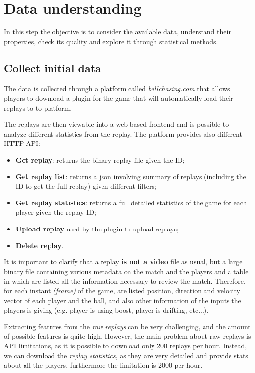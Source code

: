 \section{Data understanding} \label{seq:data_understanding}

 In this step the objective is to consider the available data, understand their properties, check its quality and explore it through statistical methods.

 \subsection{Collect initial data}

The data is collected through a platform called \textit{ballchasing.com} that allows players to download a plugin for the game that will automatically load their replays to to platform.

The replays are then viewable into a web based frontend and is possible to analyze different statistics from the replay. The platform provides also different HTTP API:

\begin{itemize}
    \item \textbf{Get replay}: returns the binary replay file given the ID;
    \item \textbf{Get replay list}: returns a json involving summary of replays (including the ID to get the full replay) given different filters;
    \item \textbf{Get replay statistics}: returns a full detailed statistics of the game for each player given the replay ID;
    \item \textbf{Upload replay} used by the plugin to upload replays;
    \item \textbf{Delete replay}.
\end{itemize}

It is important to clarify that a replay \textbf{is not a video} file as usual, but a large binary file containing various metadata on the match and the players and a table in which are listed all the information necessary to review the match.
Therefore, for each instant \textit{(frame)} of the game, are listed position, direction and velocity vector of each player and the ball, and also other information of the inputs the players is giving (e.g. player is using boost, player is drifting, etc...).

Extracting features from the \textit{raw replays} can be very challenging, and the amount of possible features is quite high. However, the main problem about raw replays is API limitations, as it is possible to download only 200 replays per hour. Instead, we can download the \textit{replay statistics}, as they are very detailed and provide stats about all the players, furthermore the limitation is 2000 per hour.

